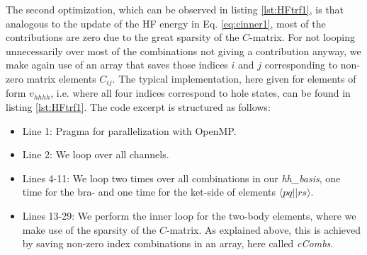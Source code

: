 The second optimization, which can be observed in listing \ref{lst:HFtrf1}, is that analogous to the update of the HF energy in Eq. \ref{eq:cinner1}, most of the contributions are zero due to the great sparsity of the $C$-matrix. For not looping unnecessarily over most of the combinations not giving a contribution anyway, we make again use of an array that saves those indices $i$ and $j$ corresponding to non-zero matrix elements $C_{ij}$. The typical implementation, here given for elements of form $v_{hhhh}$, i.e. where all four indices correspond to hole states, can be found in listing \ref{lst:HFtrf1}. The code excerpt is structured as follows:
\begin{itemize}
\item Line 1: Pragma for parallelization with OpenMP. 
\item Line 2: We loop over all channels.
\item Lines 4-11: We loop two times over all combinations in our \textit{hh\_basis}, one time for the bra- and one time for the ket-side of elements $\langle pq||rs\rangle$.
\item Lines 13-29: We perform the inner loop for the two-body elements, where we make use of the sparsity of the $C$-matrix. As explained above, this is achieved by saving non-zero index combinations in an array, here called \textit{cCombs}.
\end{itemize}





